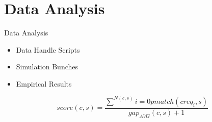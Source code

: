 \section{Data Analysis}
\begin{frame}{Data Analysis}{}
	\begin{itemize}
		\item {Data Handle Scripts}
		\item {Simulation Bunches}
		\item {Empirical Results}
	\end{itemize}
		
		\begin{equation}
			score(c,s) = \frac{\sum\limits^{N(c,s)}{i=0} pmatch(creq_{i},s)}{gap_{AVG}(c,s) + 1}
		\end{equation}

\end{frame}
